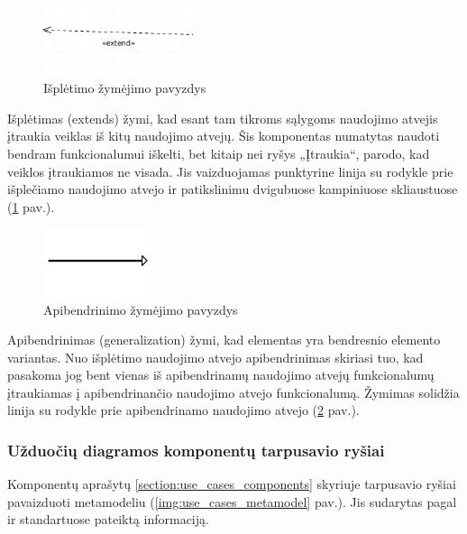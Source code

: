 \begin{figure}[H]
	\centering
	\includegraphics[height=2cm]{img/use_case_components/extend}
	\caption{Išplėtimo žymėjimo pavyzdys}
	\label{img:use_case_components_extends}
\end{figure}

Išplėtimas (extends) žymi, kad esant tam tikroms sąlygoms naudojimo atvejis įtraukia veiklas iš kitų naudojimo atvejų. Šis komponentas numatytas naudoti bendram funkcionalumui iškelti, bet kitaip nei ryšys „Įtraukia“, parodo, kad veiklos įtraukiamos ne visada. Jis vaizduojamas punktyrine linija su rodykle prie išplečiamo naudojimo atvejo ir patikslinimu dvigubuose kampiniuose skliaustuose (\ref{img:use_case_components_extends} pav.).

\begin{figure}[H]
	\centering
	\includegraphics[height=2cm]{img/use_case_components/generalization}
	\caption{Apibendrinimo žymėjimo pavyzdys}
	\label{img:use_case_components_generalization}
\end{figure}

Apibendrinimas (generalization) žymi, kad elementas yra bendresnio elemento variantas. Nuo išplėtimo naudojimo atvejo apibendrinimas skiriasi tuo, kad pasakoma jog bent vienas iš apibendrinamų naudojimo atvejų funkcionalumų įtraukiamas į apibendrinančio naudojimo atvejo funkcionalumą. Žymimas solidžia linija su rodykle prie apibendrinamo naudojimo atvejo (\ref{img:use_case_components_generalization} pav.).

\subsubsection{Užduočių diagramos komponentų tarpusavio ryšiai}

Komponentų aprašytų \ref{section:use_cases_components} skyriuje tarpusavio ryšiai  pavaizduoti metamodeliu (\ref{img:use_cases_metamodel} pav.). Jis sudarytas pagal \UML{} ir \SysML{} standartuose pateiktą informaciją. 

